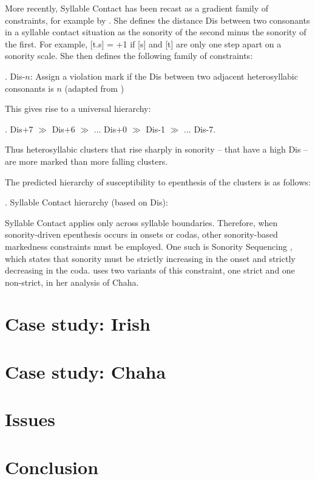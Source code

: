 \documentclass[12pt]{article}
\begin{document}
More recently, Syllable Contact has been recast as a gradient family of constraints, for example by \citet{gouskova.2002, gouskova.2004}.  She defines the distance {\sc Dis} between two consonants in a syllable contact situation as the sonority of the second minus the sonority of the first.  For example, [t.s] = +1 if [s] and [t] are only one step apart on a sonority scale.  She then defines the following family of constraints:

\ex. {\sc *Dis-}$n$: Assign a violation mark if the {\sc Dis} between two adjacent heterosyllabic consonants is $n$ (adapted from \citep{gouskova.2002})

This gives rise to a universal hierarchy:

\ex. {\sc *Dis+7} $\gg$ {\sc *Dis+6} $\gg$ ... {\sc *Dis+0} $\gg$ {\sc *Dis-1} $\gg$ ... {\sc *Dis-7}.

Thus heterosyllabic clusters that rise sharply in sonority -- that have a high {\sc Dis} -- are more marked than more falling clusters.

The predicted hierarchy of susceptibility to epenthesis of the clusters is as follows:

\ex. Syllable Contact hierarchy (based on {\sc *Dis}):

\vspace{-3em}
\noindent \resizebox{\linewidth}{!}{\usebox{\syllablecontacthierarchy}}

\bigskip

Syllable Contact applies only across syllable boundaries.  Therefore, when sonority-driven epenthesis occurs in onsets or codas, other sonority-based markedness constraints must be employed.  One such is {\sc Sonority Sequencing} \citep{selkirk.1984}, which states that sonority must be strictly increasing in the onset and strictly decreasing in the coda. \citep{rose.2000} uses two variants of this constraint, one strict and one non-strict, in her analysis of Chaha.

\section{Case study: Irish} \label{irish}

\section{Case study: Chaha} \label{chaha}

\section{Issues} \label{issues}

\section{Conclusion} \label{conclusion}



\end{document}
